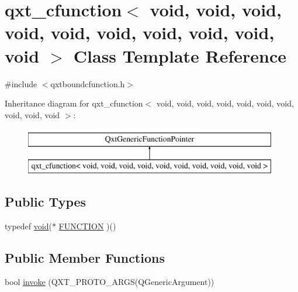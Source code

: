\hypertarget{classqxt__cfunction_3_01void_00_01void_00_01void_00_01void_00_01void_00_01void_00_01void_00_01void_00_01void_00_01void_01_4}{\section{qxt\-\_\-cfunction$<$ void, void, void, void, void, void, void, void, void, void $>$ Class Template Reference}
\label{classqxt__cfunction_3_01void_00_01void_00_01void_00_01void_00_01void_00_01void_00_01void_00_01void_00_01void_00_01void_01_4}
}


{\ttfamily \#include $<$qxtboundcfunction.\-h$>$}

Inheritance diagram for qxt\-\_\-cfunction$<$ void, void, void, void, void, void, void, void, void, void $>$\-:\begin{figure}[H]
\begin{center}
\leavevmode
\includegraphics[height=2.000000cm]{classqxt__cfunction_3_01void_00_01void_00_01void_00_01void_00_01void_00_01void_00_01void_00_01void_00_01void_00_01void_01_4}
\end{center}
\end{figure}
\subsection*{Public Types}
\begin{DoxyCompactItemize}
\item 
typedef \hyperlink{group___u_a_v_objects_plugin_ga444cf2ff3f0ecbe028adce838d373f5c}{void}($\ast$ \hyperlink{classqxt__cfunction_3_01void_00_01void_00_01void_00_01void_00_01void_00_01void_00_01void_00_01void_00_01void_00_01void_01_4_abe6a1af742943a625e251ad456e23f33}{F\-U\-N\-C\-T\-I\-O\-N} )()
\end{DoxyCompactItemize}
\subsection*{Public Member Functions}
\begin{DoxyCompactItemize}
\item 
bool \hyperlink{classqxt__cfunction_3_01void_00_01void_00_01void_00_01void_00_01void_00_01void_00_01void_00_01void_00_01void_00_01void_01_4_a542951069bf3b24d9fa21a54d249fc88}{invoke} (Q\-X\-T\-\_\-\-P\-R\-O\-T\-O\-\_\-A\-R\-G\-S(Q\-Generic\-Argument))
\end{DoxyCompactItemize}
